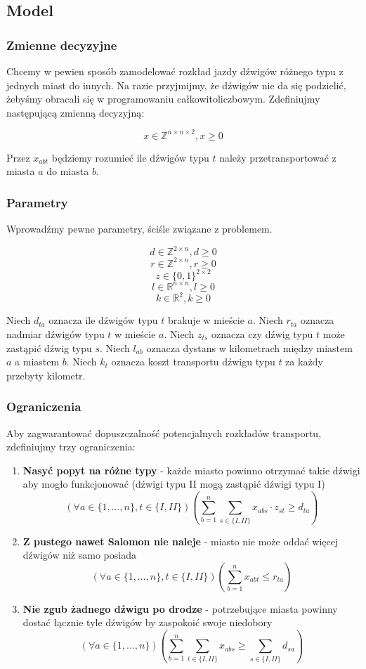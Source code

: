 \documentclass{article}
\theoremstyle{definition}
\theoremstyle{remark}
\theoremstyle{plain}
\theoremstyle{remark}
\theoremstyle{plain}
\begin{document}
\subsection{Model}
\subsubsection{Zmienne decyzyjne}
Chcemy w pewien sposób zamodelować rozkład jazdy dźwigów różnego typu z jednych miast do innych.
Na razie przyjmijmy, że dźwigów nie da się podzielić, żebyśmy obracali się w programowaniu całkowitoliczbowym.
Zdefiniujmy następującą zmienną decyzyjną:

\[ x \in \mathbb{Z}^{n\times n\times 2}, x \geq 0 \]

Przez $x_{abt}$ będziemy rozumieć ile dźwigów typu $t$ należy przetransportować z miasta $a$ do miasta $b$.

\subsubsection{Parametry}
Wprowadźmy pewne parametry, ściśle związane z problemem.

\[ d \in \mathbb{Z}^{2\times n}, d \geq 0 \]
\[ r \in \mathbb{Z}^{2\times n}, r \geq 0 \]
\[ z \in \{0,1\}^{2\times 2} \]
\[ l \in \mathbb{R}^{n\times n}, l \geq 0 \]
\[ k \in \mathbb{R}^{2}, k \geq 0 \]

Niech $d_{ta}$ oznacza ile dźwigów typu $t$ brakuje w mieście $a$.
Niech $r_{ta}$ oznacza nadmiar dźwigów typu $t$ w mieście $a$.
Niech $z_{ts}$ oznacza czy dźwig typu $t$ może zastąpić dźwig typu $s$.
Niech $l_{ab}$ oznacza dystans w kilometrach między miastem $a$ a miastem $b$.
Niech $k_t$ oznacza koszt transportu dźwigu typu $t$ za każdy przebyty kilometr.

\subsubsection{Ograniczenia}
Aby zagwarantować dopuszczalność potencjalnych rozkładów transportu, zdefiniujmy trzy ograniczenia:
\begin{enumerate}
    \item \textbf{Nasyć popyt na różne typy} - każde miasto powinno otrzymać takie dźwigi aby mogło funkcjonować (dźwigi typu II mogą zastąpić dźwigi typu I)
    \[ (\forall a \in \{1,\dots,n\}, t \in \{I,II\}) \left(\sum_{b=1}^{n}{\sum_{s \in \{I,II\}}{x_{abs} \cdot z_{st}}} \geq d_{ta} \right) \]

    \item \textbf{Z pustego nawet Salomon nie naleje} - miasto nie może oddać więcej dźwigów niż samo posiada
    \[ (\forall a \in \{1,\dots,n\}, t \in \{I,II\}) \left(\sum_{b=1}^{n}{x_{abt}} \leq r_{ta} \right) \]

    \item \textbf{Nie zgub żadnego dźwigu po drodze} - potrzebujące miasta powinny dostać łącznie tyle dźwigów by zaspokoić swoje niedobory
    \[ (\forall a \in \{1,\dots,n\}) \left(\sum_{b=1}^{n}{\sum_{t \in \{I,II\}}{x_{abs}}} \geq \sum_{s \in \{I, II\}}{d_{sa}} \right) \]
\end{enumerate}
\end{document}
